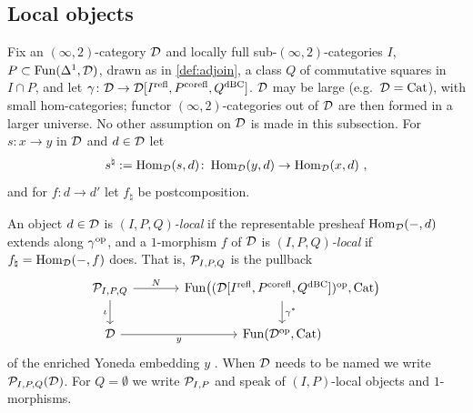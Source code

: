 \subsection{Local objects}
\label{subsec:2dloc-local}

%
Fix an $(\infty,2)$-category $\mathcal{D}$ and locally full sub-$(\infty,2)$-categories
$I$,
$P \subset \operatorname{Fun}(\Delta^{1},\mathcal{D})$,
drawn as in \cref{def:adjoin}, a class $Q$ of commutative squares in
$I \cap P$, and let
$\gamma\colon \mathcal{D} \to \mathcal{D}[{I}^{\mathrm{refl}},{P}^{\mathrm{corefl}},{Q}^{\mathrm{dBC}}]$.
$\mathcal{D}$ may be large (e.g.\ $\mathcal{D} = \mathrm{Cat}$), with small hom-categories;
functor $(\infty,2)$-categories out of $\mathcal{D}$ are then formed in a larger
universe. No other assumption on $\mathcal{D}$ is made in this subsection.
For $s\colon x \to y$ in $\mathcal{D}$ and $d \in \mathcal{D}$ let
\begin{equation*}
s^{\natural} := \operatorname{Hom}_{\mathcal{D}}(s,d)\colon \operatorname{Hom}_{\mathcal{D}}(y,d) \to \operatorname{Hom}_{\mathcal{D}}(x,d) \ ,
\end{equation*}
and for $f\colon d \to d'$ let $f_{\natural}$ be postcomposition.

\begin{defi}
\label{def:IP-local}
%
An object $d \in \mathcal{D}$ is \emph{$(I,P,Q)$-local} if the representable presheaf
$\operatorname{Hom}_{\mathcal{D}}(-,d)$ extends along $\gamma^{\mathrm{op}}$,
and a $1$-morphism $f$ of $\mathcal{D}$ is \emph{$(I,P,Q)$-local} if
$f_{\natural} = \operatorname{Hom}_{\mathcal{D}}(-,f)$
does. That is, $\mathcal{P}_{I,P,Q}$ is the pullback
\begin{equation*}
\begin{tikzcd}[column sep=large]
\Pc_{I,P,Q} \ar[r, "N"] \ar[d, "\iota"'] &
\func\bigl((\D\lrqrefl{I}{P}{Q})\opcat,\Cat\bigr) \ar[d, "\gamma^{*}"] \\
\D \ar[r, "y"'] & \func(\D\opcat,\Cat)
\end{tikzcd}
\end{equation*}
of the enriched Yoneda embedding $y$ \cite{hinich2020yoneda,heine2023enriched}.
When $\mathcal{D}$ needs to be named we write $\mathcal{P}_{I,P,Q}(\mathcal{D})$.
For $Q = \emptyset$ we write $\mathcal{P}_{I,P}$ and speak of $(I,P)$-local objects
and $1$-morphisms.
\end{defi}

